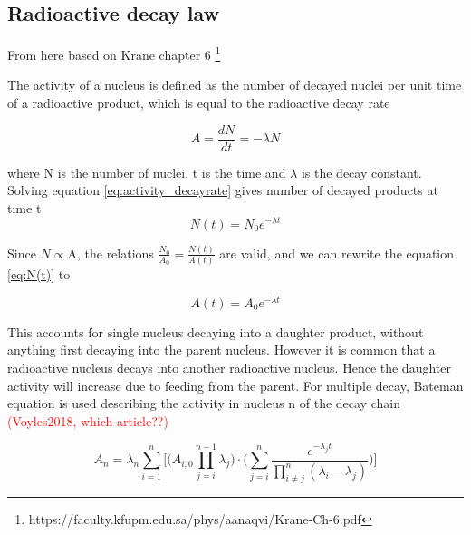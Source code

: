 \subsection{Radioactive decay law}

From here based on Krane chapter 6 \footnote{https://faculty.kfupm.edu.sa/phys/aanaqvi/Krane-Ch-6.pdf}

The activity of a nucleus is defined as the number of decayed nuclei per unit time of a radioactive product, which is equal to the radioactive decay rate 

\begin{equation} \label{eq:activity_decayrate}
   A =  \frac{dN}{dt}=-\lambda N
\end{equation}

where N is the number of nuclei, t is the time and $\lambda$ is the decay constant. Solving equation \ref{eq:activity_decayrate} gives number of decayed products at time t
\begin{equation} \label{eq:N(t)}
    N(t) = N_0 e^{-\lambda t}
\end{equation}

\noindent 
Since $N\propto$A, the relations $\frac{N_0}{A_0}=\frac{N(t)}{A(t)}$ are valid, and we can rewrite the equation \ref{eq:N(t)} to

\begin{equation} \label{eq:activity_decaylaw}
    A(t) = A_0 e^{-\lambda t}
\end{equation}


This accounts for single nucleus decaying into a daughter product, without anything first decaying into the parent nucleus. However it is common that a radioactive nucleus decays into another radioactive nucleus. Hence the daughter activity will increase due to feeding from the parent.
For multiple decay, Bateman equation is used describing the activity in nucleus n of the decay chain \textcolor{red}{(Voyles2018, which article??)}

\begin{equation} \label{eq:ndecay_chains}
    A_n = \lambda_n \sum_{i=1}^n \Big[ \Big( A_{i,0}\prod^{n-1}_{j=i}\lambda_j \Big)\cdot \Big( \sum_{j=i}^n \frac{e^{-\lambda_j t}}{\prod_{i\neq j}^n (\lambda_i - \lambda_j)} \Big) \Big]
\end{equation}

